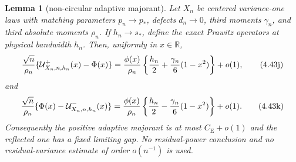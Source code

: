 \documentclass[11pt,a4paper]{article}
\numberwithin{equation}{section}
\newtheorem{lemma}[theorem]{Lemma}
\theoremstyle{definition}
\theoremstyle{remark}
\newcommand{\CE}{C_{\mathrm E}}
\begin{document}
\begin{lemma}[non-circular adaptive majorant]\label{orig:lem:adaptiveupstream}
Let $X_n$ be centered variance-one laws with matching parameters
$p_n\to p_*$, defects $d_n\to0$, third moments $\gamma_n$, and third
absolute moments $\rho_n$.  If $h_n\to s_*$, define the exact Prawitz
operators at physical bandwidth $h_n$.  Then, uniformly in $x\in\mathbb R$,
\[
 {\sqrt n\over\rho_n}\{\mathcal U^+_{X_n,n,h_n}(x)-\Phi(x)\}
 ={\phi(x)\over\rho_n}
 \left\{{h_n\over2}+{\gamma_n\over6}(1-x^2)\right\}+o(1),          \tag{4.43j}
\]
and
\[
 {\sqrt n\over\rho_n}\{\Phi(x)-\mathcal U^-_{X_n,n,h_n}(x)\}
 ={\phi(x)\over\rho_n}
 \left\{{h_n\over2}-{\gamma_n\over6}(1-x^2)\right\}+o(1).          \tag{4.43k}
\]
Consequently the positive adaptive majorant is at most $\CE+o(1)$ and
the reflected one has a fixed limiting gap.  No residual-power conclusion
and no residual-variance estimate of order $o(n^{-1})$ is used.
\end{lemma}
\end{document}
